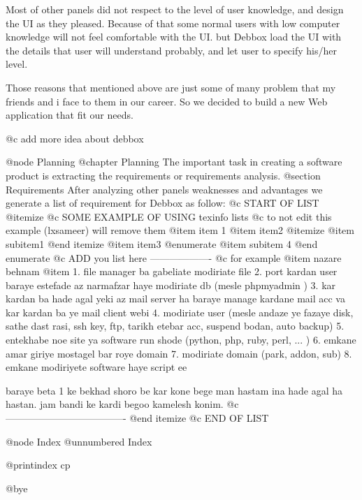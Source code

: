 Most of other panels did not respect to the level of user knowledge, and design the UI as they pleased. Because of that
some normal users with low computer knowledge will not feel comfortable with the UI. but Debbox load the UI with the details
 that user will understand probably, and let user to specify his/her level.

Those reasons that mentioned above are just some of many problem that my friends and i face to them in our career. So
we decided to build a new Web application that fit our needs.


@c add more idea about debbox       

@node Planning
@chapter Planning
The important task in creating a software product is extracting the requirements or requirements analysis. 
@section Requirements
After analyzing other panels weaknesses and advantages we generate a list of requirement for Debbox as follow:
@c START OF LIST
@itemize
@c SOME EXAMPLE OF USING texinfo lists
@c to not edit this example (lxsameer) will remove them
@item
item 1
@item
item2
@itemize
@item 
subitem1
@end itemize
@item
item3
@enumerate 
@item
subitem 4
@end enumerate
@c ADD you list here -------------------
@c for example
@item
nazare behnam
@item
1. file manager ba gabeliate modiriate file
2. port kardan user baraye estefade az narmafzar haye modiriate db (mesle phpmyadmin )
3. kar kardan ba hade agal yeki az mail server ha baraye manage kardane mail acc va kar kardan ba ye mail client webi
4. modiriate user (mesle andaze ye fazaye disk, sathe dast rasi, ssh key, ftp, tarikh etebar acc, suspend bodan, auto backup)
5. entekhabe noe site ya software run shode (python, php, ruby, perl, ... )
6. emkane amar giriye mostagel bar roye domain
7. modiriate domain (park, addon, sub)
8. emkane modiriyete software haye script ee 

baraye beta 1 ke bekhad shoro be kar kone bege man hastam ina hade agal ha hastan.
jam bandi ke kardi begoo kamelesh konim.
@c -------------------------------------
@end itemize
@c END OF LIST

@node Index
@unnumbered Index

@printindex cp

@bye
